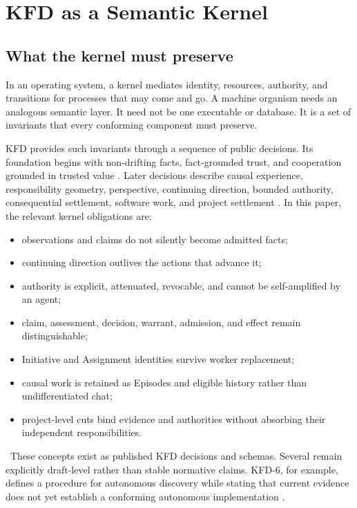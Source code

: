 \section{KFD as a Semantic Kernel}

\subsection{What the kernel must preserve}

In an operating system, a kernel mediates identity, resources, authority, and
transitions for processes that may come and go. A machine organism needs an
analogous semantic layer. It need not be one executable or database. It is a
set of invariants that every conforming component must preserve.

KFD provides such invariants through a sequence of public decisions. Its
foundation begins with non-drifting facts, fact-grounded trust, and
cooperation grounded in trusted value \cite{kfdrepo}. Later decisions describe
causal experience, responsibility geometry, perspective, continuing
direction, bounded authority, consequential settlement, software work, and
project settlement \cite{kfd6,kfd9,kfd10,kfd11,kfd12,kfd13}. In this paper,
the relevant kernel obligations are:

\begin{itemize}[leftmargin=*]
  \item observations and claims do not silently become admitted facts;
  \item continuing direction outlives the actions that advance it;
  \item authority is explicit, attenuated, revocable, and cannot be
  self-amplified by an agent;
  \item claim, assessment, decision, warrant, admission, and effect remain
  distinguishable;
  \item Initiative and Assignment identities survive worker replacement;
  \item causal work is retained as Episodes and eligible history rather than
  undifferentiated chat;
  \item project-level cuts bind evidence and authorities without absorbing
  their independent responsibilities.
\end{itemize}

\factlabel\ These concepts exist as published KFD decisions and schemas.
Several remain explicitly draft-level rather than stable normative claims.
KFD-6, for example, defines a procedure for autonomous discovery while
stating that current evidence does not yet establish a conforming autonomous
implementation \cite{kfd6}.

